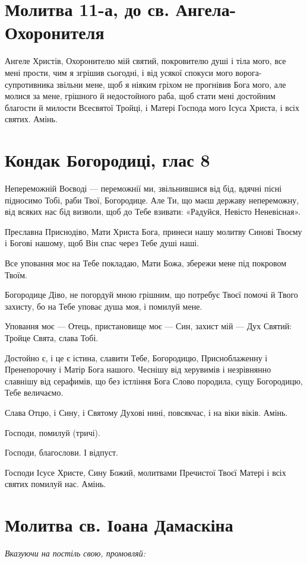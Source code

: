 \documentclass[chapters.tex]{subfiles}
\begin{document}
\section{Молитва 11-а, до св. Ангела-Охоронителя}
Ангеле Христів, Охоронителю мій святий, покровителю душі і тіла мого, все мені прости, чим я згрішив сьогодні, і від усякої спокуси мого ворога-супротивника звільни мене, щоб я ніяким гріхом не прогнівив Бога мого, але молися за мене, грішного й недостойного раба, щоб стати мені достойним благости й милости Всесвятої Тройці, і Матері Господа мого Ісуса Христа, і всіх святих. Амінь.

\section{Кондак Богородиці, глас 8}
Непереможній Воєводі — переможнії ми, звільнившися від бід, вдячні пісні підносимо Тобі, раби Твої, Богородице. Але Ти, що маєш державу непереможну, від всяких нас бід визволи, щоб до Тебе взивати: «Радуйся, Невісто Неневісная».

Преславна Приснодіво, Мати Христа Бога, принеси нашу молитву Синові Твоєму і Богові нашому, щоб Він спас через Тебе душі наші.

Все уповання моє на Тебе покладаю, Мати Божа, збережи мене під покровом Твоїм.

Богородице Діво, не погордуй мною грішним, що потребує Твоєї помочі й Твого захисту, бо на Тебе уповає душа моя, і помилуй мене.

Уповання моє — Отець, пристановище моє — Син, захист мій — Дух Святий: Тройце Свята, слава Тобі.

Достойно є, і це є істина, славити Тебе, Богородицю, Присноблаженну і Пренепорочну і Матір Бога нашого. Чеснішу від херувимів і незрівнянно славнішу від серафимів, що без істління Бога Слово породила, сущу Богородицю, Тебе величаємо.

Слава Отцю, і Сину, і Святому Духові нині, повсякчас, і на віки віків. Амінь.

Господи, помилуй (тричі).

Господи, благослови. І відпуст.

Господи Ісусе Христе, Сину Божий, молитвами Пречистої Твоєї Матері і всіх святих помилуй нас. Амінь.

\section{Молитва св. Іоана Дамаскіна}
\emph{Вказуючи на постіль свою, промовляй:}
\end{document}
